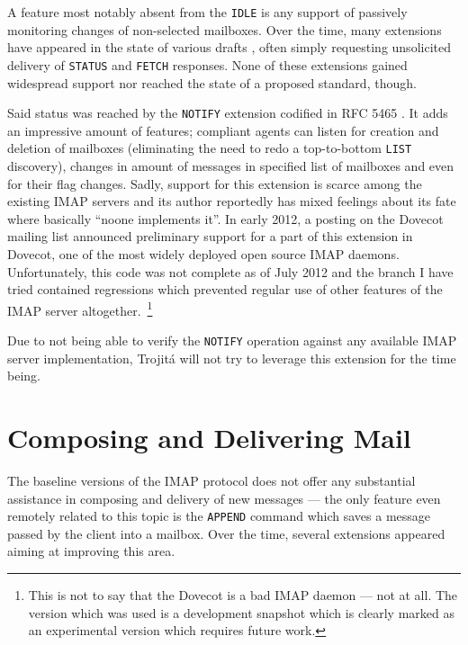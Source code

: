 \documentclass[trojita]{subfiles}
\begin{document}
A feature most notably absent from the {\tt IDLE} is any support of passively monitoring changes of non-selected
mailboxes.  Over the time, many extensions have appeared in the state of various drafts
\cite{draft-wener-lemonade-clearidle} \cite{draft-gulbrandsen-imap-nostore} \cite{draft-magicaltux-imap4-idleplus},
often simply requesting unsolicited delivery of {\tt STATUS} and {\tt FETCH} responses.  None of these extensions gained
widespread support nor reached the state of a proposed standard, though.

Said status was reached by the {\tt NOTIFY} extension codified in RFC 5465 \cite{rfc5465}.  It adds an impressive amount
of features; compliant agents can listen for creation and deletion of mailboxes (eliminating the need to redo a
top-to-bottom {\tt LIST} discovery), changes in amount of messages in specified list of mailboxes and even for their
flag changes.  Sadly, support for this extension is scarce among the existing IMAP servers and its author reportedly has
mixed feelings \cite{arnt-good-bad-rfc} about its fate where basically ``noone implements it''.  In early 2012, a
posting on the Dovecot mailing list announced \cite{dovecot-imap-notify} preliminary support for a part of this
extension in Dovecot, one of the most widely deployed open source IMAP daemons.  Unfortunately, this code was not
complete as of July 2012 \cite{dovecot-hg-notify} and the branch I have tried contained regressions which prevented
regular use of other features of the IMAP server altogether.~\footnote{This is not to say that the Dovecot is a bad IMAP
daemon --- not at all.  The version which was used is a development snapshot which is clearly marked as an experimental
version which requires future work.}

\begin{trojitabehavior}
Due to not being able to verify the {\tt NOTIFY} operation against any available IMAP server implementation, Trojitá
will not try to leverage this extension for the time being.
\end{trojitabehavior}

\section{Composing and Delivering Mail}

The baseline versions of the IMAP protocol does not offer any substantial assistance in composing and delivery of new
messages --- the only feature even remotely related to this topic is the {\tt APPEND} command which saves a message
passed by the client into a mailbox.  Over the time, several extensions appeared aiming at improving this area.
\end{document}
